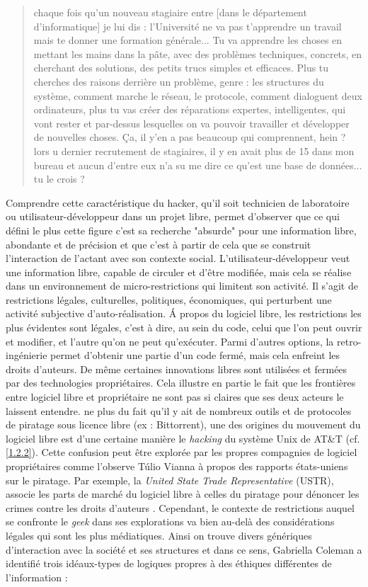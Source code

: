 \begin{quote}
chaque fois qu'un nouveau stagiaire entre [dans le département d'informatique] je lui dis : l'Université ne va pas t'apprendre un travail mais te donner une formation générale... Tu va apprendre les choses en mettant les mains dans la pâte, avec des problèmes techniques, concrets, en cherchant des solutions, des petits trucs simples et efficaces. Plus tu cherches des raisons derrière un problème, genre : les structures du système, comment marche le réseau, le protocole, comment dialoguent deux ordinateurs, plus tu vas créer des réparations expertes, intelligentes, qui vont rester et par-dessus lesquelles on va pouvoir travailler et développer de nouvelles choses. \c Ca, il y'en a pas beaucoup qui comprennent, hein ? lors u dernier recrutement de stagiaires, il y en avait plus de 15 dans mon bureau et aucun d'entre eux n'a su me dire ce qu'est une base de données... tu le crois ?
\end{quote}

Comprendre cette caractéristique du hacker, qu'il soit technicien de laboratoire ou utilisateur-développeur dans un projet libre, permet d'observer que ce qui défini le plus cette figure c'est sa recherche "absurde" pour une information libre, abondante et de précision et que c'est à partir de cela que se construit l'interaction de l'actant avec son contexte social. L'utilisateur-développeur veut une information libre, capable de circuler et d'être modifiée, mais cela se réalise dans un environnement de micro-restrictions qui limitent son activité. Il s'agit de restrictions légales, culturelles, politiques, économiques, qui perturbent une activité subjective d'auto-réalisation. \'A propos du logiciel libre, les restrictions les plus évidentes sont légales, c'est à dire, au sein du code, celui que l'on peut ouvrir et modifier, et l'autre qu'on ne peut qu'exécuter. Parmi d'autres options, la retro-ingénierie permet d'obtenir une partie d'un code fermé, mais cela enfreint les droits d'auteurs. De même certaines innovations libres sont utilisées et fermées par des technologies propriétaires. Cela illustre en partie le fait que les frontières entre logiciel libre et propriétaire ne sont pas si claires que ses deux acteurs le laissent entendre. ne plus du fait qu'il y ait de nombreux outils et de protocoles de piratage sous licence libre (ex : Bittorrent), une des origines du mouvement du logiciel libre est d'une certaine manière le \emph{hacking} du système Unix de AT\&T (cf. \ref{1.2.2}). Cette confusion peut être explorée par les propres compagnies de logiciel propriétaires comme l'observe T\'ulio Vianna  à propos des rapports états-uniens sur le piratage. Par exemple, la \emph{United State Trade Representative} (USTR), associe les parts de marché du logiciel libre à celles  du piratage pour dénoncer les crimes contre les droits d'auteurs \citep{Vianna2006}. 
Cependant, le contexte de restrictions auquel se confronte le \emph{geek} dans ses explorations va bien au-delà des considérations légales qui sont les plus médiatiques. Ainsi on trouve divers génériques d'interaction avec la société et ses structures et dans ce sens, Gabriella Coleman a identifié trois idéaux-types de logiques propres à des éthiques différentes de l'information :

